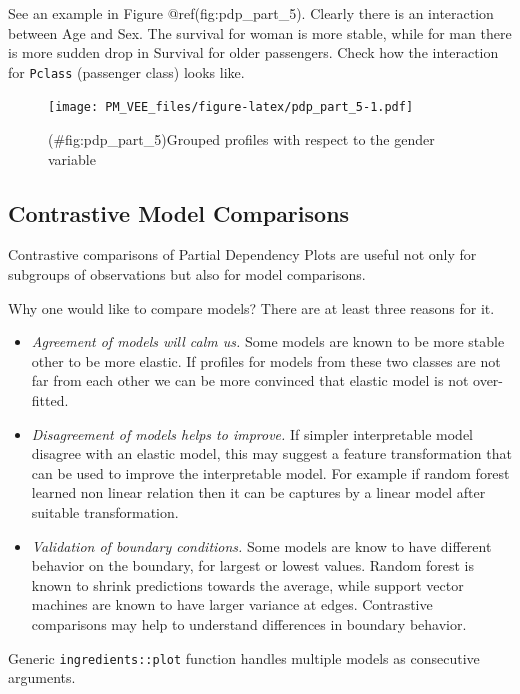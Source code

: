 \documentclass[12pt,]{krantz}
\providecommand{\tightlist}{%
  \setlength{\itemsep}{0pt}\setlength{\parskip}{0pt}}
\begin{document}
See an example in Figure @ref(fig:pdp\_part\_5). Clearly there is an interaction between Age and Sex. The survival for woman is more stable, while for man there is more sudden drop in Survival for older passengers.
Check how the interaction for \texttt{Pclass} (passenger class) looks like.

\begin{figure}
\centering
\texttt{[image: PM\_VEE\_files/figure-latex/pdp\_part\_5-1.pdf]}
\caption{(\#fig:pdp\_part\_5)Grouped profiles with respect to the gender variable}
\end{figure}

\hypertarget{contrastive-model-comparisons}{%
\subsection{Contrastive Model Comparisons}\label{contrastive-model-comparisons}}

Contrastive comparisons of Partial Dependency Plots are useful not only for subgroups of observations but also for model comparisons.

Why one would like to compare models? There are at least three reasons for it.

\begin{itemize}
\tightlist
\item
  \emph{Agreement of models will calm us.} Some models are known to be more stable other to be more elastic. If profiles for models from these two classes are not far from each other we can be more convinced that elastic model is not over-fitted.
\item
  \emph{Disagreement of models helps to improve.} If simpler interpretable model disagree with an elastic model, this may suggest a feature transformation that can be used to improve the interpretable model. For example if random forest learned non linear relation then it can be captures by a linear model after suitable transformation.
\item
  \emph{Validation of boundary conditions.} Some models are know to have different behavior on the boundary, for largest or lowest values. Random forest is known to shrink predictions towards the average, while support vector machines are known to have larger variance at edges. Contrastive comparisons may help to understand differences in boundary behavior.
\end{itemize}

Generic \texttt{ingredients::plot} function handles multiple models as consecutive arguments.
\end{document}
